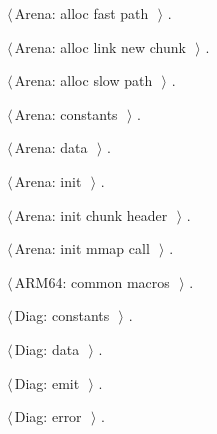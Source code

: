 \documentclass[11pt,a4paper,twoside,openright,DIV=15]{scrbook}
\theoremstyle{definition}
\theoremstyle{plain}
\theoremstyle{remark}
\begin{document}
{\small\begin{list}{}{\setlength{\itemsep}{-\parsep}\setlength{\itemindent}{-\leftmargin}}
\item $\langle\,$Arena: alloc fast path\nobreak\ {\footnotesize {}}$\,\rangle$ {\footnotesize {\NWtxtRefIn} .}
\item $\langle\,$Arena: alloc link new chunk\nobreak\ {\footnotesize {}}$\,\rangle$ {\footnotesize {\NWtxtRefIn} .}
\item $\langle\,$Arena: alloc slow path\nobreak\ {\footnotesize {}}$\,\rangle$ {\footnotesize {\NWtxtRefIn} .}
\item $\langle\,$Arena: constants\nobreak\ {\footnotesize {}}$\,\rangle$ {\footnotesize {\NWtxtRefIn} .}
\item $\langle\,$Arena: data\nobreak\ {\footnotesize {}}$\,\rangle$ {\footnotesize {\NWtxtRefIn} .}
\item $\langle\,$Arena: init\nobreak\ {\footnotesize {}}$\,\rangle$ {\footnotesize {\NWtxtRefIn} .}
\item $\langle\,$Arena: init chunk header\nobreak\ {\footnotesize {}}$\,\rangle$ {\footnotesize {\NWtxtRefIn} .}
\item $\langle\,$Arena: init mmap call\nobreak\ {\footnotesize {}}$\,\rangle$ {\footnotesize {\NWtxtRefIn} .}
\item $\langle\,$ARM64: common macros\nobreak\ {\footnotesize {}}$\,\rangle$ {\footnotesize {\NWtxtRefIn} .
}
\item $\langle\,$Diag: constants\nobreak\ {\footnotesize {}}$\,\rangle$ {\footnotesize {\NWtxtRefIn} .}
\item $\langle\,$Diag: data\nobreak\ {\footnotesize {}}$\,\rangle$ {\footnotesize {\NWtxtRefIn} .}
\item $\langle\,$Diag: emit\nobreak\ {\footnotesize {}}$\,\rangle$ {\footnotesize {\NWtxtRefIn} .}
\item $\langle\,$Diag: error\nobreak\ {\footnotesize {}}$\,\rangle$ {\footnotesize {\NWtxtRefIn} .}

\end{list}}
\end{document}
